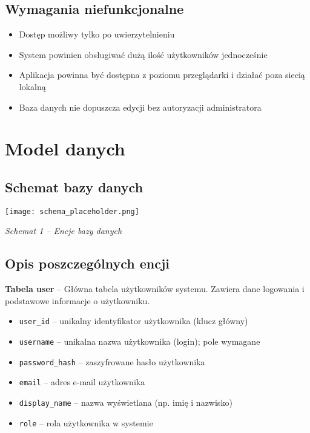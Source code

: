 \documentclass[a4paper,12pt]{article}
\begin{document}
\subsection{Wymagania niefunkcjonalne}

\begin{itemize}
  \item Dostęp możliwy tylko po uwierzytelnieniu
  \item System powinien obsługiwać dużą ilość użytkowników jednocześnie
  \item Aplikacja powinna być dostępna z poziomu przeglądarki i działać poza siecią lokalną
  \item Baza danych nie dopuszcza edycji bez autoryzacji administratora
\end{itemize}


\section{Model danych}

\subsection{Schemat bazy danych}
\begin{center}
\texttt{[image: schema\_placeholder.png]}
\end{center}
\textit{Schemat 1 – Encje bazy danych}

\subsection{Opis poszczególnych encji}

\textbf{Tabela user} – Główna tabela użytkowników systemu. Zawiera dane logowania i podstawowe informacje o użytkowniku.

\begin{itemize}
  \item \texttt{user\_id} – unikalny identyfikator użytkownika (klucz główny)
  \item \texttt{username} – unikalna nazwa użytkownika (login); pole wymagane
  \item \texttt{password\_hash} – zaszyfrowane hasło użytkownika
  \item \texttt{email} – adres e-mail użytkownika
  \item \texttt{display\_name} – nazwa wyświetlana (np. imię i nazwisko)
  \item \texttt{role} – rola użytkownika w systemie
\end{itemize}
\end{document}
